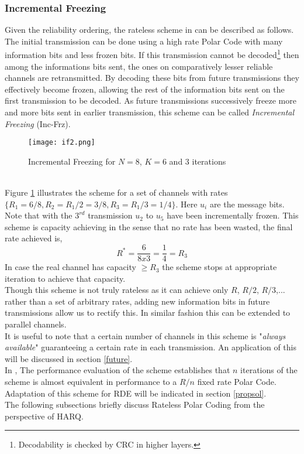 \documentclass[
11pt, %
a4paper, %
oneside, %
headinclude,footinclude, %
BCOR5mm, %
]{scrartcl}
\begin{document}
\subsubsection{Incremental Freezing}\label{if}
Given the reliability ordering, the rateless scheme in \cite{chen} can be described as follows. The initial transmission can be done using a high rate Polar Code with many information bits and less frozen bits. If this transmission cannot be decoded\footnote{Decodability is checked by CRC in higher layers.} then among the informations bits sent, the ones on comparatively lesser reliable channels are retransmitted. By decoding these bits from future transmissions they effectively become frozen, allowing the rest of the information bits sent on the first transmission to be decoded.  As future transmissions successively freeze more and more bits sent in earlier transmission, this scheme can be called \emph{Incremental Freezing} (Inc-Frz).
\begin{figure}[h]
 \begin{center}
    \texttt{[image: if2.png]}
  \end{center}
  \caption{Incremental Freezing for $N=8$, $K=6$ and $3$ iterations}
  \label{fig:if}
\end{figure}  
\\Figure \ref{fig:if} illustrates the scheme for a set of channels with rates $\{ R_1=6/8, R_2= R_1/2=3/8,R_3= R_1/3=1/4\}$. Here $u_i$ are the message bits. Note that with the $3^{rd}$ transmission  $u_2$ to $u_{5}$ have been incrementally frozen. This scheme is capacity achieving in the sense that no rate has been wasted, the final rate achieved is, $$R^*= \frac{6}{8x3}=\frac{1}{4}=R_3 $$ In case the real channel has capacity $ \geq R_3$ the scheme stops at appropriate iteration to achieve that capacity.\\
Though this scheme is not truly rateless as it can achieve only $R$, $R/2$, $R/3$,... rather than a set of arbitrary rates, adding new information bits in future transmissions allow us to rectify this. In similar fashion this can be extended to parallel channels.\\
It is useful to note that a certain number of channels in this scheme is "\emph{always available}" guaranteeing a certain rate in each transmission. An application of this will be discussed in section \ref{future}.
\\In \cite{chen}, The performance evaluation of the scheme establishes that $n$ iterations of the scheme is almost equivalent in performance to a $R/n$ fixed rate Polar Code.
\\Adaptation of this scheme for RDE will be indicated in section \ref{propsol}.
\\The following subsections briefly discuss Rateless Polar Coding from the perspective of HARQ.
\end{document}
